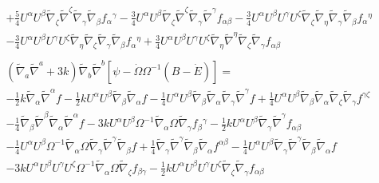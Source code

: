 \documentclass[10pt,letterpaper]{article}
\numberwithin{equation}{section}
\begin{document}
\begin{eqnarray}
&& + \tfrac{5}{4} U^{\alpha } U^{\beta } \tilde{\nabla}_{\zeta }\tilde{\nabla}^{\zeta }\tilde{\nabla}_{\gamma }\tilde{\nabla}_{\beta }f_{\alpha }{}^{\gamma } -  \tfrac{3}{4} U^{\alpha } U^{\beta } \tilde{\nabla}_{\zeta }\tilde{\nabla}^{\zeta }\tilde{\nabla}_{\gamma }\tilde{\nabla}^{\gamma }f_{\alpha \beta } -  \tfrac{3}{4} U^{\alpha } U^{\beta } U^{\gamma } U^{\zeta } \tilde{\nabla}_{\zeta }\tilde{\nabla}_{\eta }\tilde{\nabla}_{\gamma }\tilde{\nabla}_{\beta }f_{\alpha }{}^{\eta } \nonumber \\ 
&& -  \tfrac{3}{4} U^{\alpha } U^{\beta } U^{\gamma } U^{\zeta } \tilde{\nabla}_{\eta }\tilde{\nabla}_{\zeta }\tilde{\nabla}_{\gamma }\tilde{\nabla}_{\beta }f_{\alpha }{}^{\eta } + \tfrac{3}{4} U^{\alpha } U^{\beta } U^{\gamma } U^{\zeta } \tilde{\nabla}_{\eta }\tilde{\nabla}^{\eta }\tilde{\nabla}_{\zeta }\tilde{\nabla}_{\gamma }f_{\alpha \beta }
\\ \nonumber\\
&&(\tilde\nabla_a\tilde\nabla^a + 3k)\tilde\nabla_b\tilde\nabla^b[ \psi-\dot \Omega \Omega^{-1}(B-\dot E)]=
\nonumber\\
 && - \tfrac{1}{2} k \tilde{\nabla}_{\alpha }\tilde{\nabla}^{\alpha }f -  \tfrac{1}{2} k U^{\alpha } U^{\beta } \tilde{\nabla}_{\beta }\tilde{\nabla}_{\alpha }f -  \tfrac{1}{4} U^{\alpha } U^{\beta } \tilde{\nabla}_{\beta }\tilde{\nabla}_{\alpha }\tilde{\nabla}_{\gamma }\tilde{\nabla}^{\gamma }f + \tfrac{1}{4} U^{\alpha } U^{\beta } \tilde{\nabla}_{\beta }\tilde{\nabla}_{\alpha }\tilde{\nabla}_{\zeta }\tilde{\nabla}_{\gamma }f^{\gamma \zeta } \nonumber \\ 
 && -  \tfrac{1}{4} \tilde{\nabla}_{\beta }\tilde{\nabla}^{\beta }\tilde{\nabla}_{\alpha }\tilde{\nabla}^{\alpha }f - 3 k U^{\alpha } U^{\beta } \Omega^{-1} \tilde{\nabla}_{\alpha }\Omega \tilde{\nabla}_{\gamma }f_{\beta }{}^{\gamma } -  \tfrac{1}{2} k U^{\alpha } U^{\beta } \tilde{\nabla}_{\gamma }\tilde{\nabla}^{\gamma }f_{\alpha \beta } \nonumber \\ 
 && -  \tfrac{1}{4} U^{\alpha } U^{\beta } \Omega^{-1} \tilde{\nabla}_{\alpha }\Omega \tilde{\nabla}_{\gamma }\tilde{\nabla}^{\gamma }\tilde{\nabla}_{\beta }f + \tfrac{1}{4} \tilde{\nabla}_{\gamma }\tilde{\nabla}^{\gamma }\tilde{\nabla}_{\beta }\tilde{\nabla}_{\alpha }f^{\alpha \beta } -  \tfrac{1}{4} U^{\alpha } U^{\beta } \tilde{\nabla}_{\gamma }\tilde{\nabla}^{\gamma }\tilde{\nabla}_{\beta }\tilde{\nabla}_{\alpha }f \nonumber \\ 
 && - 3 k U^{\alpha } U^{\beta } U^{\gamma } U^{\zeta } \Omega^{-1} \tilde{\nabla}_{\alpha }\Omega \tilde{\nabla}_{\zeta }f_{\beta \gamma } -  \tfrac{1}{2} k U^{\alpha } U^{\beta } U^{\gamma } U^{\zeta } \tilde{\nabla}_{\zeta }\tilde{\nabla}_{\gamma }f_{\alpha \beta } \nonumber \\ 

\end{eqnarray}
\end{document}
